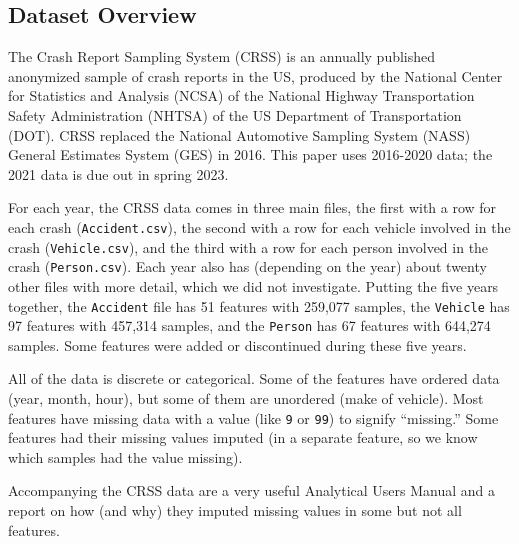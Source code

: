 \subsection{Dataset Overview}

The Crash Report Sampling System (CRSS) \citep{CRSS} is an annually published anonymized sample of crash reports in the US, produced by the National Center for Statistics and Analysis (NCSA) of the National Highway Transportation Safety Administration (NHTSA) of the US Department of Transportation (DOT).  CRSS replaced the National Automotive Sampling System (NASS) General Estimates System (GES) in 2016.  This paper uses 2016-2020 data; the 2021 data is due out in spring 2023.  

For each year, the CRSS data comes in three main files, the first with a row for each crash (\verb|Accident.csv|), the second with a row for each vehicle involved in the crash (\verb|Vehicle.csv|), and the third with a row for each person involved in the crash (\verb|Person.csv|).  Each year also has (depending on the year) about twenty other files with more detail, which we did not investigate.  Putting the five years together, the \verb|Accident| file has 51 features with 259,077 samples, the \verb|Vehicle| has 97 features with 457,314 samples, and the \verb|Person| has 67 features with 644,274 samples.  Some features were added or discontinued during these five years.  

All of the data is discrete or categorical.  Some of the features have ordered data (year, month, hour), but some of them are unordered (make of vehicle).  Most features have missing data with a value (like \verb|9| or \verb|99|) to signify ``missing.''  Some features had their missing values imputed (in a separate feature, so we know which samples had the value missing).

Accompanying the CRSS data are a very useful Analytical Users Manual \citep{CRSS_Manual} and a report on how (and why) they imputed missing values in some but not all features. \citep{CRSS_Imputation}

